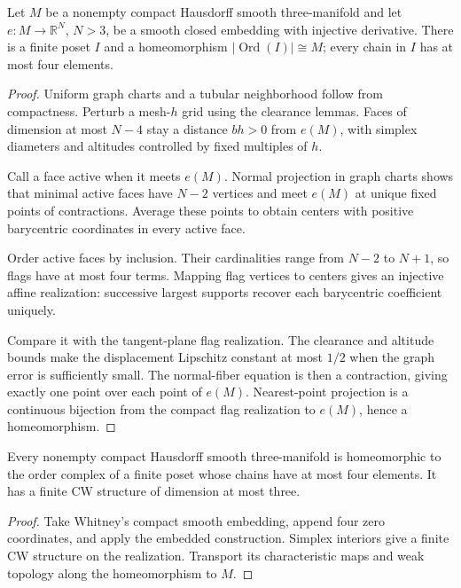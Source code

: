 \begin{proposition}
\label{prop:foundations-embedded-triangulation}
Let $M$ be a nonempty compact Hausdorff smooth three-manifold and let
$e:M\to\mathbb R^N$, $N>3$, be a smooth closed embedding with
injective derivative. There is a finite poset $I$ and a homeomorphism
$|\operatorname{Ord}(I)|\cong M$; every chain in $I$ has at most
four elements.
\end{proposition}
\begin{proof}
Uniform graph charts and a tubular neighborhood follow from compactness.
Perturb a mesh-$h$ grid using the clearance lemmas. Faces of dimension
at most $N-4$ stay a distance $bh>0$ from $e(M)$, with simplex
diameters and altitudes controlled by fixed multiples of $h$.

Call a face active when it meets $e(M)$. Normal projection in graph
charts shows that minimal active faces have $N-2$ vertices and meet
$e(M)$ at unique fixed points of contractions. Average these points to
obtain centers with positive barycentric coordinates in every active face.

Order active faces by inclusion. Their cardinalities range from $N-2$
to $N+1$, so flags have at most four terms. Mapping flag vertices to
centers gives an injective affine realization: successive largest supports
recover each barycentric coefficient uniquely.

Compare it with the tangent-plane flag realization. The clearance and
altitude bounds make the displacement Lipschitz constant at most $1/2$
when the graph error is sufficiently small. The normal-fiber equation
is then a contraction, giving exactly one point over each point of
$e(M)$. Nearest-point projection is a continuous bijection from the
compact flag realization to $e(M)$, hence a homeomorphism.
\end{proof}

\begin{proposition}
\label{prop:foundations-triangulation}
Every nonempty compact Hausdorff smooth three-manifold is homeomorphic
to the order complex of a finite poset whose chains have at most four
elements. It has a finite CW structure of dimension at most three.
\end{proposition}
\begin{proof}
Take Whitney's compact smooth embedding, append four zero coordinates,
and apply the embedded construction. Simplex interiors give a finite
CW structure on the realization. Transport its characteristic maps and
weak topology along the homeomorphism to $M$.
\end{proof}

